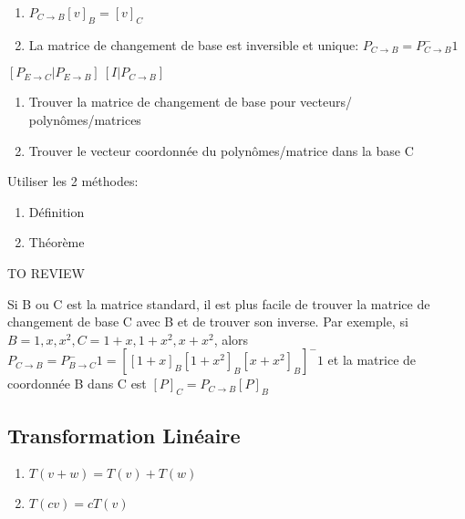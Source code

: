 \documentclass{article}
\begin{document}
\begin{theorem}
    \begin{enumerate}
	\item $ P_{C \rightarrow B} [v]_B = [v]_C $
	\item La matrice de changement de base est inversible et unique:
	    $ P_{C \rightarrow B} = P_{C \rightarrow B}^-1 $
    \end{enumerate}
\end{theorem}

\begin{theorem}
    $ [ P_{E \rightarrow C} | P_{E \rightarrow B}] ~
    [I | P_{C \rightarrow B} ] $
\end{theorem}

\begin{problem}
    \begin{enumerate}
        \item Trouver la matrice de changement de base pour vecteurs/
	    polynômes/matrices
	\item Trouver le vecteur coordonnée du polynômes/matrice dans
	    la base C
    \end{enumerate}
    Utiliser les 2 méthodes:
    \begin{enumerate}
        \item Définition
	\item Théorème
    \end{enumerate}
    TO REVIEW
\end{problem}

\begin{remark}
    Si B ou C est la matrice standard, il est plus facile de trouver
    la matrice de changement de base C avec B et de trouver son inverse.
    Par exemple, si $B={1,x,x^2}, C={1+x,1+x^2, x+x^2}$, alors
    $ P_{C \rightarrow B} = P_{B \rightarrow C}^-1 =
    [ [1+x]_B [1+x^2]_B [x+x^2]_B ] ^-1 $ et la matrice de coordonnée
    B dans C est $ [P]_C = P_{C \rightarrow B} [P]_B $
\end{remark}

\subsection{Transformation Linéaire}%
\label{sub:Transformation Linéaire}

\begin{definition}
    \begin{enumerate}
	\item $ T(v+w) = T(v) + T(w) $
	\item $T(cv) = c T(v) $
    \end{enumerate}
\end{definition}
\end{document}

